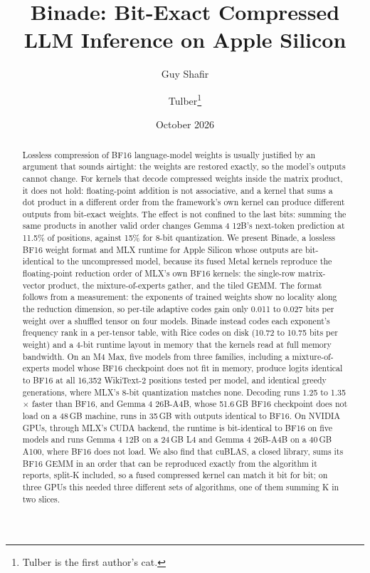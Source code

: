 \documentclass[11pt]{article}
\title{Binade: Bit-Exact Compressed LLM Inference on Apple Silicon}
\author{Guy Shafir \and Tulber\thanks{Tulber is the first author's cat.}}
\date{October 2026}
\newcommand{\x}{$\times$}
\begin{document}
\maketitle

\begin{abstract}
Lossless compression of BF16 language-model weights is usually justified by an argument that sounds airtight: the weights are restored exactly, so the model's outputs cannot change.
For kernels that decode compressed weights inside the matrix product, it does not hold: floating-point addition is not associative, and a kernel that sums a dot product in a different order from the framework's own kernel can produce different outputs from bit-exact weights. The effect is not confined to the last bits: summing the same products in another valid order changes Gemma 4 12B's next-token prediction at 11.5\% of positions, against 15\% for 8-bit quantization.
We present Binade, a lossless BF16 weight format and MLX runtime for Apple Silicon whose outputs are bit-identical to the uncompressed model, because its fused Metal kernels reproduce the floating-point reduction order of MLX's own BF16 kernels: the single-row matrix-vector product, the mixture-of-experts gather, and the tiled GEMM.
The format follows from a measurement: the exponents of trained weights show no locality along the reduction dimension, so per-tile adaptive codes gain only 0.011 to 0.027 bits per weight over a shuffled tensor on four models. Binade instead codes each exponent's frequency rank in a per-tensor table, with Rice codes on disk (10.72 to 10.75 bits per weight) and a 4-bit runtime layout in memory that the kernels read at full memory bandwidth.
On an M4 Max, five models from three families, including a mixture-of-experts model whose BF16 checkpoint does not fit in memory, produce logits identical to BF16 at all 16,352 WikiText-2 positions tested per model, and identical greedy generations, where MLX's 8-bit quantization matches none. Decoding runs 1.25 to 1.35\x{} faster than BF16, and Gemma 4 26B-A4B, whose 51.6\,GB BF16 checkpoint does not load on a 48\,GB machine, runs in 35\,GB with outputs identical to BF16.
On NVIDIA GPUs, through MLX's CUDA backend, the runtime is bit-identical to BF16 on five models and runs Gemma 4 12B on a 24\,GB L4 and Gemma 4 26B-A4B on a 40\,GB A100, where BF16 does not load. We also find that cuBLAS, a closed library, sums its BF16 GEMM in an order that can be reproduced exactly from the algorithm it reports, split-K included, so a fused compressed kernel can match it bit for bit; on three GPUs this needed three different sets of algorithms, one of them summing K in two slices.
\end{abstract}
\end{document}
